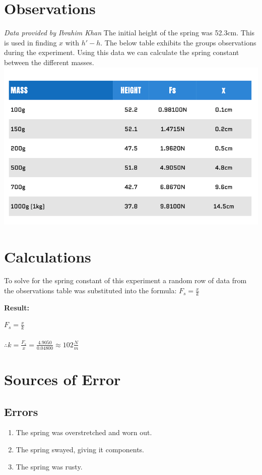 \documentclass{article}
\begin{document}
\section*{Observations}
\textit{Data provided by Ibrahim Khan}\newline
The initial height of the spring was 52.3cm. This is used in finding $x$ with $h\prime - h$.
The below table exhibits the groups observations during the experiment. Using this data we can calculate the spring constant between the different masses.\newline
\includegraphics[scale=0.5]{./images/data_table.png}
\section*{Calculations}
\noindent To solve for the spring constant of this experiment a random row of data from the observations table was substituted into the formula: $F_{s} = \frac{x}{k}$
\newline

\noindent\textbf{Result:} \\
\begin{adjustwidth}{0.5cm}{0pt}
    $F_{s} = \frac{x}{k}$ \\\\
    $\therefore k = \frac{F_{s}}{x} = \frac{4.9050}{0.04800} \approx 102\frac{N}{m}$
\end{adjustwidth}

\section*{Sources of Error}
\subsection*{Errors}
\begin{enumerate}
    \item {The spring was overstretched and worn out.}
    \item {The spring swayed, giving it components.}
    \item {The spring was rusty.}
\end{enumerate}
\end{document}
